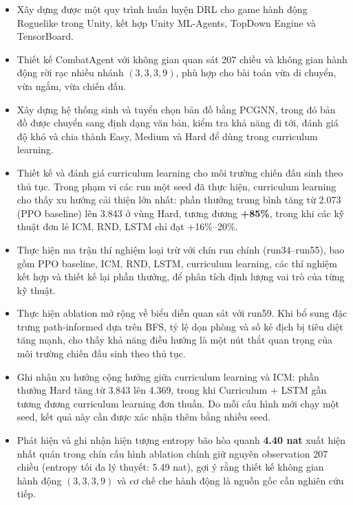 \renewcommand{\labelitemi}{$-$}
\begin{itemize}
    \item Xây dựng được một quy trình huấn luyện DRL cho game hành động Roguelike trong Unity, kết hợp Unity ML-Agents, TopDown Engine và TensorBoard.
    \item Thiết kế CombatAgent với không gian quan sát 207 chiều và không gian hành động rời rạc nhiều nhánh $(3,3,3,9)$, phù hợp cho bài toán vừa di chuyển, vừa ngắm, vừa chiến đấu.
    \item Xây dựng hệ thống sinh và tuyển chọn bản đồ bằng PCGNN, trong đó bản đồ được chuyển sang định dạng văn bản, kiểm tra khả năng đi tới, đánh giá độ khó và chia thành Easy, Medium và Hard để dùng trong curriculum learning.
    \item Thiết kế và đánh giá curriculum learning cho môi trường chiến đấu sinh theo thủ tục. Trong phạm vi các run một seed đã thực hiện, curriculum learning cho thấy xu hướng cải thiện lớn nhất: phần thưởng trung bình tăng từ 2.073 (PPO baseline) lên 3.843 ở vùng Hard, tương đương \textbf{+85\%}, trong khi các kỹ thuật đơn lẻ ICM, RND, LSTM chỉ đạt +16\%--20\%.
    \item Thực hiện ma trận thí nghiệm loại trừ với chín run chính (run34--run55), bao gồm PPO baseline, ICM, RND, LSTM, curriculum learning, các thí nghiệm kết hợp và thiết kế lại phần thưởng, để phân tích định lượng vai trò của từng kỹ thuật.
    \item Thực hiện ablation mở rộng về biểu diễn quan sát với run59. Khi bổ sung đặc trưng path-informed dựa trên BFS, tỷ lệ dọn phòng và số kẻ địch bị tiêu diệt tăng mạnh, cho thấy khả năng điều hướng là một nút thắt quan trọng của môi trường chiến đấu sinh theo thủ tục.
    \item Ghi nhận xu hướng cộng hưởng giữa curriculum learning và ICM: phần thưởng Hard tăng từ 3.843 lên 4.369, trong khi Curriculum + LSTM gần tương đương curriculum learning đơn thuần. Do mỗi cấu hình mới chạy một seed, kết quả này cần được xác nhận thêm bằng nhiều seed.
    \item Phát hiện và ghi nhận hiện tượng entropy bão hòa quanh \textbf{4.40 nat} xuất hiện nhất quán trong chín cấu hình ablation chính giữ nguyên observation 207 chiều (entropy tối đa lý thuyết: 5.49 nat), gợi ý rằng thiết kế không gian hành động $(3,3,3,9)$ và cơ chế che hành động là nguồn gốc cần nghiên cứu tiếp.
\end{itemize}

\vspace{0.3cm}

